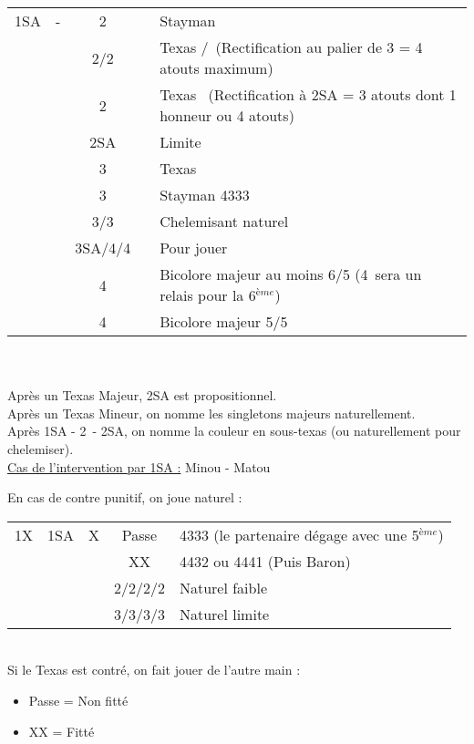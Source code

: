 \documentclass[a4paper, oneside, 11pt]{report}
\begin{document}
		\begin{tabular}{cccc|l}
		1SA & - & 2\trefle && Stayman\\
		&& 2\carreau/2\coeur && Texas \coeur/\pique\ (Rectification au palier de 3 = 4 atouts maximum)\\
		&& 2\pique && Texas \trefle\ (Rectification à 2SA = 3 atouts dont 1 honneur ou 4 atouts)\\
		&& 2SA && Limite\\
		&& 3\trefle && Texas \carreau\\
		&& 3\carreau && Stayman 4333\\
		&& 3\coeur/3\pique && Chelemisant naturel\\
		&& 3SA/4\coeur/4\pique && Pour jouer\\
		&& 4\trefle && Bicolore majeur au moins 6/5 (4\carreau\ sera un relais pour la 6$^{ème}$)\\
		&& 4\carreau && Bicolore majeur 5/5\\
		\end{tabular}\\\\

		Après un Texas Majeur,  2SA est propositionnel.\\
		Après un Texas Mineur,  on nomme les singletons majeurs naturellement.\\
		Après 1SA - 2\trefle\ - 2SA,  on nomme la couleur en sous-texas (ou naturellement pour chelemiser).\\

		\underline{Cas de l'intervention par 1SA :} Minou - Matou
	
		En cas de contre punitif, on joue naturel :\\
		\begin{tabular}{cccc|l}
		1X & 1SA & X & Passe & 4333 (le partenaire dégage avec une 5$^{ème}$)\\
		&&& XX & 4432 ou 4441 (Puis Baron)\\
		&&& 2\trefle/2\carreau/2\coeur/2\pique & Naturel faible\\
		&&& 3\trefle/3\carreau/3\coeur/3\pique & Naturel limite\\
		\end{tabular}\\

		Si le Texas est contré, on fait jouer de l'autre main :
		\begin{itemize}
		\item Passe = Non fitté
		\item XX = Fitté\\
		\end{itemize}
		
\end{document}
